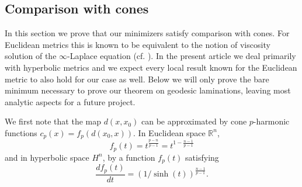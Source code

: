 \documentclass{ip-journal}
\theoremstyle{definition}
\newtheorem{definition}[theorem]{Definition}
\numberwithin{equation}{section}
\newcommand{\R}{\mathbb R}
\begin{document}

%
\subsection{Comparison with cones}
In this section we prove that our minimizers satisfy comparison with cones. For Euclidean metrics this is known to be equivalent to the notion of viscosity solution of the $\infty$-Laplace equation (cf. \cite{crandal}). In the present article we deal primarily with hyperbolic metrics and we expect every local result known for the Euclidean metric to also hold for our case as well. Below we will only prove the bare minimum necessary to prove our theorem on geodesic laminations, leaving most analytic aspects for a future project.

We first note that the
 map $d(x,x_0)$ can be approximated by  cone $ p$-harmonic functions $c_p(x) = f_p(d(x_0,x))$. In Euclidean space $\R^n$,
 \[ 
 f_p(t) = t^{\frac{p-n}{p-1}}=t^{1-\frac{n-1}{p-1}}
 \] 
 and in hyperbolic space $H^n$, by a function $f_p(t)$ satisfying 
 \[
 \frac{df_p(t)}{dt} = (1/\sinh(t))^{\frac{n-1}{p-1}}. 
 \]
 
\end{document}

